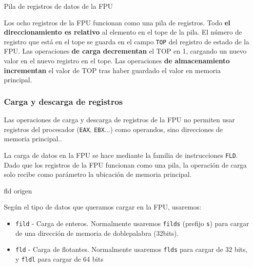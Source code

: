 \documentclass[11pt]{scrartcl}
\begin{document}
\begin{center}

  \begin{drawstackbare}
     
     
     
  \end{drawstackbare}

  Pila de registros de datos de la FPU
\end{center}

\bigskip

Los ocho registros de la FPU funcionan como una pila de registros. Todo
\textbf{el direccionamiento es relativo} al elemento en el tope de la pila. El
número de registro que está en el tope se guarda en el campo \texttt{TOP} del
registro de estado de la FPU. Las operaciones \textbf{de carga decrementan} el
TOP en 1, cargando un nuevo valor en el nuevo registro en el tope. Las
operaciones \textbf{de almacenamiento incrementan} el valor de TOP tras haber
guardado el valor en memoria principal.

\subsubsection{Carga y descarga de registros}

Las operaciones de carga y descarga de registros de la FPU no permiten usar
registros del procesador (\texttt{EAX}, \texttt{EBX}...) como operandos, sino
direcciones de memoria principal..

La carga de datos en la FPU se hace mediante la familia de instrucciones
\texttt{FLD}. Dado que los registros de la FPU funcionan como una pila, la
operación de carga solo recibe como parámetro la ubicación de memoria principal.

\begin{gascode}
  fld origen
\end{gascode}

Según el tipo de datos que queramos cargar en la FPU, usaremos:
\begin{itemize}
\item \texttt{fild} - Carga de enteros. Normalmente usaremos \texttt{filds}
  (prefijo \texttt{s}) para cargar de una dirección de memoria de doblepalabra (32bits).
\item \texttt{fld} - Carga de flotantes. Normalmente usaremos \texttt{flds} para
  cargar de 32 bits, y \texttt{fldl} para cargar de 64 bits
\end{itemize}
\end{document}
